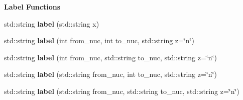 \begin{Indent}{\bf Label Functions}
\begin{DoxyCompactItemize}
\item 
\hypertarget{namespacepyne_1_1rxname_a9183e4eb4d2f8386238df017a6763910}{std\-::string {\bfseries label} (std\-::string x)}\label{namespacepyne_1_1rxname_a9183e4eb4d2f8386238df017a6763910}

\item 
\hypertarget{namespacepyne_1_1rxname_a1d990996b1b80abcdf8ba7cb03bf9c0b}{std\-::string {\bfseries label} (int from\-\_\-nuc, int to\-\_\-nuc, std\-::string z=\char`\"{}n\char`\"{})}\label{namespacepyne_1_1rxname_a1d990996b1b80abcdf8ba7cb03bf9c0b}

\item 
\hypertarget{namespacepyne_1_1rxname_a2e4d7d20d4278d6b6b5b57592fab287b}{std\-::string {\bfseries label} (int from\-\_\-nuc, std\-::string to\-\_\-nuc, std\-::string z=\char`\"{}n\char`\"{})}\label{namespacepyne_1_1rxname_a2e4d7d20d4278d6b6b5b57592fab287b}

\item 
\hypertarget{namespacepyne_1_1rxname_aff83b91df8abe88197680a467b843969}{std\-::string {\bfseries label} (std\-::string from\-\_\-nuc, int to\-\_\-nuc, std\-::string z=\char`\"{}n\char`\"{})}\label{namespacepyne_1_1rxname_aff83b91df8abe88197680a467b843969}

\item 
\hypertarget{namespacepyne_1_1rxname_aa316be9d06a9987cb9816cc26926a237}{std\-::string {\bfseries label} (std\-::string from\-\_\-nuc, std\-::string to\-\_\-nuc, std\-::string z=\char`\"{}n\char`\"{})}\label{namespacepyne_1_1rxname_aa316be9d06a9987cb9816cc26926a237}

\end{DoxyCompactItemize}
\end{Indent}
